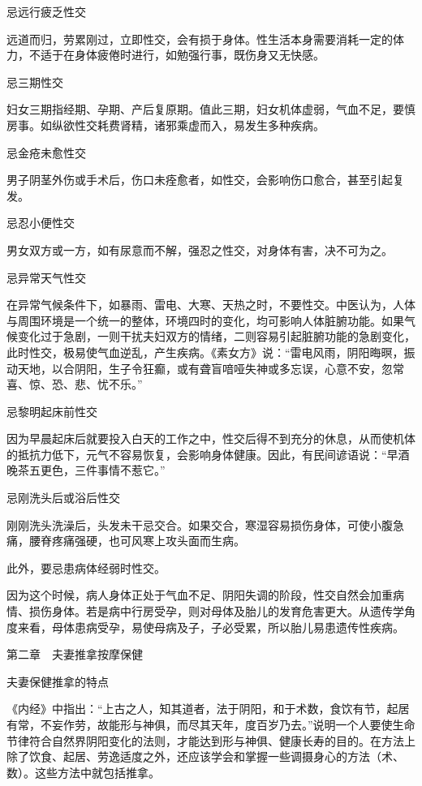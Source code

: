 \documentclass[12pt,UTF8]{ctexbook}
\begin{document}
忌远行疲乏性交

远道而归，劳累刚过，立即性交，会有损于身体。性生活本身需要消耗一定的体力，不适于在身体疲倦时进行，如勉强行事，既伤身又无快感。

忌三期性交

妇女三期指经期、孕期、产后复原期。值此三期，妇女机体虚弱，气血不足，要慎房事。如纵欲性交耗费肾精，诸邪乘虚而入，易发生多种疾病。

忌金疮未愈性交

男子阴茎外伤或手术后，伤口未痊愈者，如性交，会影响伤口愈合，甚至引起复发。

忌忍小便性交

男女双方或一方，如有尿意而不解，强忍之性交，对身体有害，决不可为之。

忌异常天气性交

在异常气候条件下，如暴雨、雷电、大寒、天热之时，不要性交。中医认为，人体与周围环境是一个统一的整体，环境四时的变化，均可影响人体脏腑功能。如果气候变化过于急剧，一则干扰夫妇双方的情绪，二则容易引起脏腑功能的急剧变化，此时性交，极易使气血逆乱，产生疾病。《素女方》说：“雷电风雨，阴阳晦暝，振动天地，以合阴阳，生子令狂癫，或有聋盲喑哑失神或多忘误，心意不安，忽常喜、惊、恐、悲、忧不乐。”

忌黎明起床前性交

因为早晨起床后就要投入白天的工作之中，性交后得不到充分的休息，从而使机体的抵抗力低下，元气不容易恢复，会影响身体健康。因此，有民间谚语说：“早酒晚茶五更色，三件事情不惹它。”

忌刚洗头后或浴后性交

刚刚洗头洗澡后，头发未干忌交合。如果交合，寒湿容易损伤身体，可使小腹急痛，腰脊疼痛强硬，也可风寒上攻头面而生病。

此外，要忌患病体经弱时性交。

因为这个时候，病人身体正处于气血不足、阴阳失调的阶段，性交自然会加重病情、损伤身体。若是病中行房受孕，则对母体及胎儿的发育危害更大。从遗传学角度来看，母体患病受孕，易使母病及子，子必受累，所以胎儿易患遗传性疾病。





第二章　夫妻推拿按摩保健


夫妻保健推拿的特点


《内经》中指出：“上古之人，知其道者，法于阴阳，和于术数，食饮有节，起居有常，不妄作劳，故能形与神俱，而尽其天年，度百岁乃去。”说明一个人要使生命节律符合自然界阴阳变化的法则，才能达到形与神俱、健康长寿的目的。在方法上除了饮食、起居、劳逸适度之外，还应该学会和掌握一些调摄身心的方法（术、数）。这些方法中就包括推拿。
\end{document}
